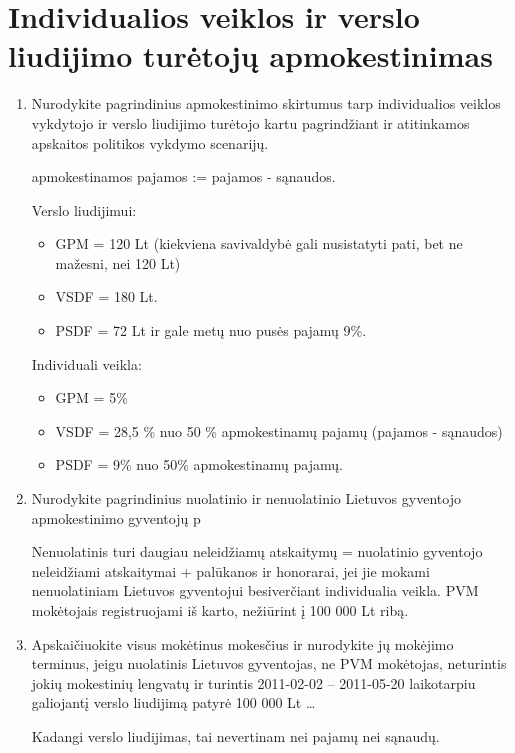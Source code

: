 \chapter{Individualios veiklos ir verslo liudijimo turėtojų
apmokestinimas}

\begin{enumerate}
  \item Nurodykite pagrindinius apmokestinimo skirtumus tarp
    individualios veiklos vykdytojo ir verslo liudijimo turėtojo
    kartu pagrindžiant ir atitinkamos apskaitos politikos
    vykdymo scenarijų.

    apmokestinamos pajamos := pajamos - sąnaudos.

    Verslo liudijimui:
    \begin{itemize}
      \item GPM = 120 Lt (kiekviena savivaldybė gali nusistatyti pati,
        bet ne mažesni, nei 120 Lt)
      \item VSDF = 180 Lt.
      \item PSDF = 72 Lt ir gale metų nuo pusės pajamų 9\%.
    \end{itemize}

    Individuali veikla:
    \begin{itemize}
      \item GPM = 5\%
      \item VSDF = 28,5 \% nuo 50 \% apmokestinamų pajamų (pajamos -
        sąnaudos)
      \item PSDF = 9\% nuo 50\% apmokestinamų pajamų.
    \end{itemize}

  \item Nurodykite pagrindinius nuolatinio ir nenuolatinio Lietuvos
    gyventojo apmokestinimo gyventojų p

    Nenuolatinis turi daugiau neleidžiamų atskaitymų = nuolatinio
    gyventojo neleidžiami atskaitymai + palūkanos ir honorarai,
    jei jie mokami nenuolatiniam Lietuvos gyventojui besiverčiant
    individualia veikla. PVM mokėtojais registruojami iš karto,
    nežiūrint į 100 000 Lt ribą.

  \item Apskaičiuokite visus mokėtinus mokesčius ir nurodykite jų
    mokėjimo terminus, jeigu nuolatinis Lietuvos gyventojas, ne
    PVM mokėtojas, neturintis jokių mokestinių lengvatų ir
    turintis 2011-02-02 – 2011-05-20 laikotarpiu galiojantį verslo
    liudijimą patyrė 100 000 Lt …

    Kadangi verslo liudijimas, tai nevertinam nei pajamų nei
    sąnaudų.
    

\end{enumerate}
